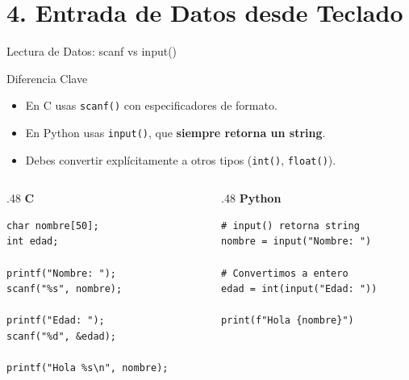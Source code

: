 \documentclass{beamer}
\begin{document}
\section{4. Entrada de Datos desde Teclado}

\begin{frame}[fragile]{Lectura de Datos: scanf vs input()}
  \begin{block}{Diferencia Clave}
    \begin{itemize}
      \item En C usas \texttt{scanf()} con especificadores de formato.
      \item En Python usas \texttt{input()}, que \textbf{siempre retorna un string}.
      \item Debes convertir explícitamente a otros tipos (\texttt{int()}, \texttt{float()}).
    \end{itemize}
  \end{block}

  \begin{columns}[T]
    \begin{column}{.48\textwidth}
      \centering\textbf{C}
      \begin{verbatim}
char nombre[50];
int edad;

printf("Nombre: ");
scanf("%s", nombre);

printf("Edad: ");
scanf("%d", &edad);

printf("Hola %s\n", nombre);
      \end{verbatim}
    \end{column}
    \begin{column}{.48\textwidth}
      \centering\textbf{Python}
      \begin{verbatim}
# input() retorna string
nombre = input("Nombre: ")

# Convertimos a entero
edad = int(input("Edad: "))

print(f"Hola {nombre}")
      \end{verbatim}
    \end{column}
  \end{columns}
\end{frame}
\end{document}
